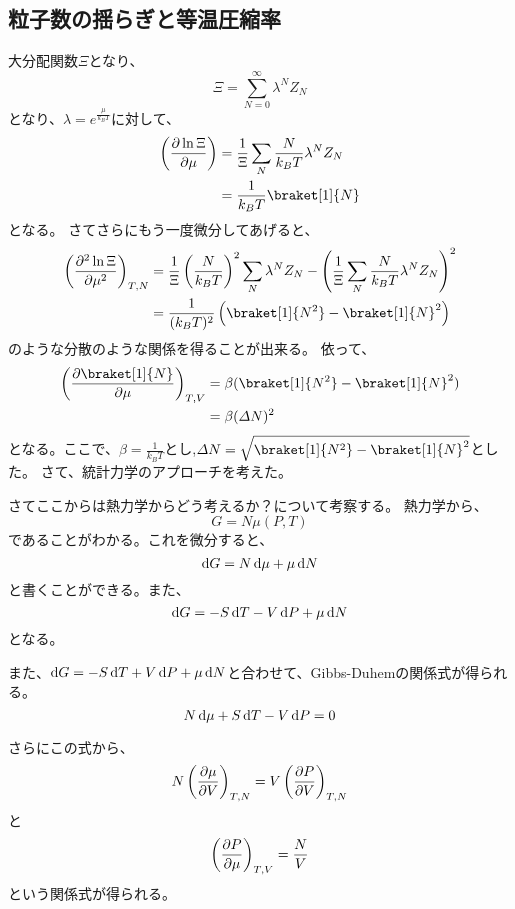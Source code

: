 \documentclass[titlepage]{ltjsarticle}
\newcommand{\ev}[1]{\braket[1]{#1}}
\begin{document}
\subsection{粒子数の揺らぎと等温圧縮率}
大分配関数\(\Xi\)となり、
\begin{equation}
  \Xi = \sum_{N=0}^{\infty}\lambda^N Z_N 
\end{equation}
となり、\(\lambda=e^{\frac{\mu}{k_BT}}\)に対して、
\begin{align}
  \left( \pdv{\ln \Xi}{\mu} \right) & = \frac{1}{\Xi} \sum_N \frac{N}{k_BT}\lambda^N Z_N\\
  & = \frac{1}{k_BT} \ev{N} 
\end{align}
となる。
さてさらにもう一度微分してあげると、
\begin{align}
  \left( \pdv[order=2]{\ln \Xi}{\mu} \right)_{T,N} &= \frac{1}{\Xi}\left( \frac{N}{k_BT} \right)^2 \sum_N \lambda^N Z_N - \left( \frac{1}{\Xi} \sum_N \frac{N}{k_BT}\lambda^N Z_N \right)^2\\
  & = \frac{1}{(k_BT)^2} \left( \ev{N^2} - \ev{N}^2 \right)
\end{align}
のような分散のような関係を得ることが出来る。
依って、
\begin{align}\label{eq:0.4}
  \left(\pdv{\ev{N}}{\mu}\right)_{T,V} & = \beta (\ev{N^2} - \ev{N}^2)\\
  & = \beta (\varDelta N)^2
\end{align}
となる。ここで、\(\beta = \frac{1}{k_BT}\)とし,\(\varDelta N = \sqrt{\ev{N^2} - \ev{N}^2}\)とした。
さて、統計力学のアプローチを考えた。

さてここからは熱力学からどう考えるか？について考察する。
熱力学から、
\begin{equation}
  G = N \mu(P,T)
\end{equation}
であることがわかる。これを微分すると、
\begin{equation}
  \odif{G} = N \odif{\mu} + \mu \odif{N}
\end{equation}
と書くことができる。また、
\begin{equation}
  \odif{G} = -S \odif{T} - V \odif{P} + \mu \odif{N}
\end{equation}
となる。

また、\(\odif{G}= -S \odif{T} +V \odif{P} + \mu \odif{N}\)と合わせて、Gibbs-Duhemの関係式が得られる。
\begin{equation}
  N \odif{\mu} + S \odif{T} - V \odif{P} = 0
\end{equation}

さらにこの式から、
\begin{equation}
  N \left( \pdv{\mu}{V} \right)_{T,N} =V\left( \pdv{P}{V} \right)_{T,N}
\end{equation}
と
\begin{equation}
  \left( \pdv{P}{\mu} \right)_{T,V} = \frac{N}{V}
\end{equation}
という関係式が得られる。
\end{document}
